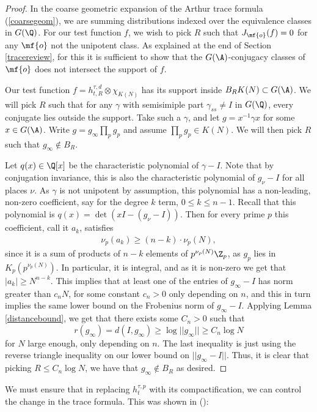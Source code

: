 \begin{proof}
\noindent  In the coarse geometric expansion of the Arthur trace formula (\ref{coarsegeom}), we are summing distributions indexed over the equivalence classes in $G(\Q)$. For our test function $f$, we wish to pick $R$ such that $J_{\mf{o}}(f)=0$ for any $\mf{o}$ not the unipotent class. As explained at the end of Section \ref{tracereview}, for this it is sufficient to show that the $G(\A)$-conjugacy classes of $\mf{o}$ does not intersect the support of $f$.

Our test function $f=h^{\tau,d}_{t,R}\otimes \chi_{K(N)}$ has its support inside $B_R K(N)\subset G(\A)$. We will pick $R$ such that for any $\gamma$ with semisimiple part $\gamma_{ss}\neq I$ in $G(\Q)$, every conjugate lies outside the support. Take such a $\gamma$, and let $g = x^{-1}\gamma x$ for some $x\in G(\A)$. Write $g=g_\infty\prod_pg_p$ and assume $\prod_pg_p\in K(N)$. We will then pick $R$ such that $g_\infty\notin B_R$.

Let $q(x)\in\Q[x]$ be the characteristic polynomial of $\gamma-I$. Note that by conjugation invariance, this is also the characteristic polynomial of $g_\nu-I$ for all places $\nu$. As $\gamma$ is not unipotent by assumption, this polynomial has a non-leading, non-zero coefficient, say for the degree $k$ term, $0\leq k\leq n-1$. Recall that this polynomial is $q(x)=\det(xI-(g_\nu-I))$. Then for every prime $p$ this coefficient, call it $a_k$, satisfies
\begin{align*}
    \nu_p(a_k) \geq (n-k)\cdot\nu_p(N),
\end{align*}
since it is a sum of products of $n-k$ elements of $p^{\nu_p(N)}\Z_p$, as $g_p$ lies in $K_p(p^{\nu_p(N)})$. In particular, it is integral, and as it is non-zero we get that $|a_k|\geq N^{n-k}$. This implies that at least one of the entries of $g_\infty-I$ has norm greater than $c_n N$, for some constant $c_n>0$ only depending on $n$, and this in turn implies the same lower bound on the Frobenius norm of $g_\infty-I$. Applying Lemma \ref{distancebound}, we get that there exists some $C_n>0$ such that
$$r(g_\infty)=d(I,g_\infty)\geq \log||g_\infty||\geq C_n\log N$$
for $N$ large enough, only depending on $n$. The last inequality is just using the reverse triangle inequality on our lower bound on $||g_\infty-I||$. Thus, it is clear that picking $R\leq C_n\log N$, we have that $g_\infty\notin B_R$ as desired.
\end{proof}

\noindent We must ensure that in replacing $h_t^{\tau,p}$ with its compactification, we can control the change in the trace formula. This was shown in (\cite{MzM2}):

